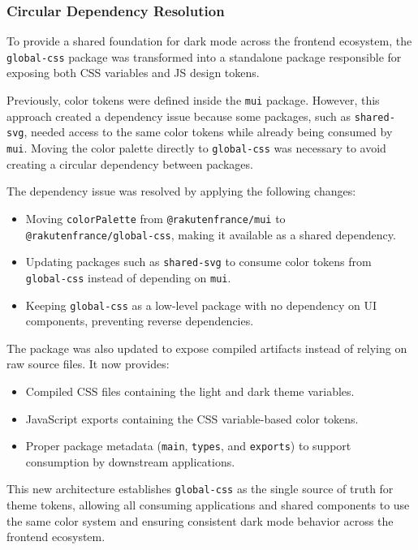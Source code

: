 \subsubsection{Circular Dependency Resolution}

To provide a shared foundation for dark mode across the frontend ecosystem, the \texttt{global-css} package was transformed into a standalone package responsible for exposing both CSS variables and \ac{JS} design tokens.

Previously, color tokens were defined inside the \lstinline|mui| package. However, this approach created a dependency issue because some packages, such as \lstinline|shared-svg|, needed access to the same color tokens while already being consumed by \lstinline|mui|. Moving the color palette directly to \lstinline|global-css| was necessary to avoid creating a circular dependency between packages.

The dependency issue was resolved by applying the following changes:

\begin{itemize}
    \item Moving \lstinline|colorPalette| from \lstinline|@rakutenfrance/mui| to \lstinline|@rakutenfrance/global-css|, making it available as a shared dependency.
    \item Updating packages such as \lstinline|shared-svg| to consume color tokens from \lstinline|global-css| instead of depending on \lstinline|mui|.
    \item Keeping \lstinline|global-css| as a low-level package with no dependency on UI components, preventing reverse dependencies.
\end{itemize}

The package was also updated to expose compiled artifacts instead of relying on raw source files. It now provides:

\begin{itemize}
    \item Compiled CSS files containing the light and dark theme variables.
    \item JavaScript exports containing the CSS variable-based color tokens.
    \item Proper package metadata (\lstinline|main|, \lstinline|types|, and \lstinline|exports|) to support consumption by downstream applications.
\end{itemize}

This new architecture establishes \lstinline|global-css| as the single source of truth for theme tokens, allowing all consuming applications and shared components to use the same color system and ensuring consistent dark mode behavior across the frontend ecosystem.

